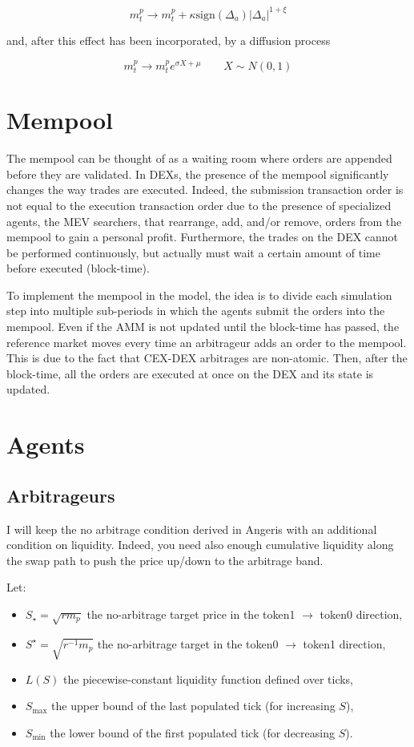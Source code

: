 \documentclass[a4paper,11pt]{article}
\begin{document}
 \begin{equation}
     m^p_t \to m^p_t + \kappa \text{sign}(\Delta_a) |\Delta_a|^{1+\xi}
 \end{equation}

 and, after this effect has been incorporated, by a diffusion process

 \begin{equation}
     m^p_t \to m^p_t e^{\sigma X+\mu} \qquad X \sim N(0,1)
 \end{equation}

\section{Mempool}
The mempool can be thought of as a waiting room where orders are appended before they are validated. In DEXs, the presence of the mempool significantly changes the way trades are executed. Indeed, the submission transaction order is not equal to the execution transaction order due to the presence of specialized agents, the MEV searchers, that rearrange, add, and/or remove, orders from the mempool to gain a personal profit. Furthermore, the trades on the DEX cannot be performed continuously, but actually must wait a certain amount of time before executed (block-time). 

To implement the mempool in the model, the idea is to divide each simulation step into multiple sub-periods in which the agents submit the orders into the mempool. Even if the AMM is not updated until the block-time has passed, the reference market moves every time an arbitrageur adds an order to the mempool. This is due to the fact that CEX-DEX arbitrages are non-atomic. Then, after the block-time, all the orders are executed at once on the DEX and its state is updated.

\section{Agents}
\subsection{Arbitrageurs}
I will keep the no arbitrage condition derived in Angeris with an additional condition on liquidity. Indeed, you need also enough cumulative liquidity along the swap path to push the price up/down to the arbitrage band.

Let:
\begin{itemize}
  \item $S_\star = \sqrt{r m_p}$ the no-arbitrage target price in the token1 $\to$ token0 direction,
  \item $S^\star = \sqrt{r^{-1} m_p}$ the no-arbitrage target in the token0 $\to$ token1 direction,
  \item $L(S)$ the piecewise-constant liquidity function defined over ticks,
  \item $S_{\max}$ the upper bound of the last populated tick (for increasing $S$),
  \item $S_{\min}$ the lower bound of the first populated tick (for decreasing $S$).
\end{itemize}
\end{document}
